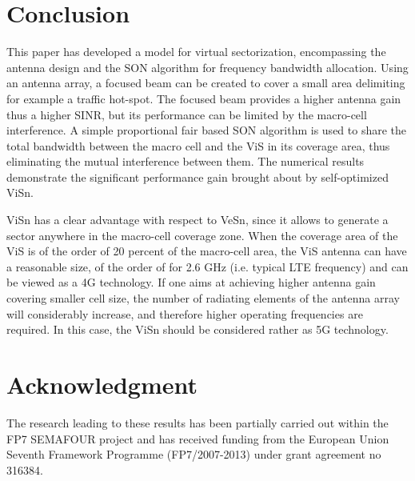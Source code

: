 \documentclass[conference]{IEEEtran}
\begin{document}
\section{Conclusion} \label{sec:conclusion}
	This paper has developed a model for virtual sectorization, encompassing the antenna design and the \ac{SON} algorithm for frequency bandwidth allocation. Using an antenna array, a focused beam can be created to cover a small area delimiting for example a traffic hot-spot. The focused beam provides a higher antenna gain thus a higher \ac{SINR}, but its performance can be limited by the macro-cell interference. A simple proportional fair based \ac{SON} algorithm is used to share the total bandwidth between the macro cell and the \ac{ViS} in its coverage area, thus eliminating the mutual interference between them. The numerical results demonstrate the significant performance gain brought about by self-optimized \ac{ViSn}.

	\ac{ViSn} has a clear advantage with respect to \ac{VeSn}, since it allows to generate a sector anywhere in the macro-cell coverage zone. When the coverage area of the \ac{ViS} is of the order of 20 percent of the macro-cell area, the \ac{ViS} antenna can have a reasonable size, of the order of  for 2.6 GHz (i.e. typical \ac{LTE} frequency) and can be viewed as a 4G technology. If one aims at achieving higher antenna gain covering smaller cell size, the number of radiating elements of the antenna array will considerably increase, and therefore higher operating frequencies are required. In this case, the \ac{ViSn} should be considered rather as 5G technology.


\section*{Acknowledgment}
	The research leading to these results has been partially carried out within the FP7 SEMAFOUR project and has received funding from the European Union Seventh Framework Programme (FP7/2007-2013) under grant agreement no 316384.




\end{document}
